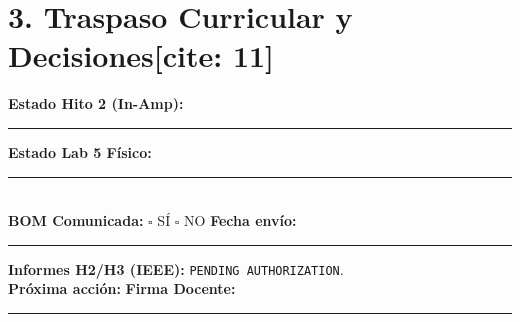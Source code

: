 \documentclass[10pt, a4paper, landscape]{article}
\begin{document}
\section*{3. Traspaso Curricular y Decisiones[cite: 11]}
\begin{tcolorbox}[colback=white, colframe=black]
    \footnotesize
    \textbf{Estado Hito 2 (In-Amp):} \rule{6.5cm}{0.4pt} \quad \textbf{Estado Lab 5 Físico:} \rule{6.5cm}{0.4pt} \\
    \textbf{BOM Comunicada:} $\square$ SÍ \quad $\square$ NO \quad \textbf{Fecha envío:} \rule{3.0cm}{0.4pt} \quad \textbf{Informes H2/H3 (IEEE):} \texttt{PENDING AUTHORIZATION}. \\[0.15cm]
    \textbf{Próxima acción:} \hrulefill \quad \textbf{Firma Docente:} \rule{4cm}{0.4pt}
\end{tcolorbox}
\end{document}
